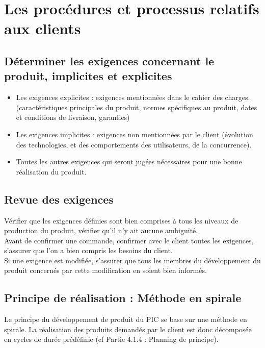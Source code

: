 
\section{Les procédures et processus relatifs aux clients}
\label{client}

\subsection{Déterminer les exigences concernant le produit, implicites et explicites}

\begin{itemize}
\item Les exigences explicites : exigences mentionnées dans le cahier des charges. (caractéristiques principales du produit, normes spécifiques au produit, dates et conditions de livraison, garanties)
\item Les exigences implicites : exigences non mentionnées par le client (évolution des technologies, et des comportements des utilisateurs, de la concurrence).
\item Toutes les autres exigences qui seront jugées nécessaires pour une bonne réalisation du produit.
\end{itemize}

\subsection{Revue des exigences}

Vérifier que les exigences définies sont bien comprises à tous les niveaux de production du produit, vérifier qu’il n’y ait aucune ambiguïté. \\
Avant de confirmer une commande, confirmer avec le client toutes les exigences, s’assurer que l’on a bien compris les besoins du client.\\
Si une exigence est modifiée, s’assurer que tous les membres du développement du produit concernés par cette modification en soient bien informés.\\

\subsection{Principe de réalisation : Méthode en spirale}
Le principe du développement de produit du PIC \nomPIC{} se base sur une méthode en spirale. La réalisation des produits demandés par le client est donc décomposée en cycles de durée prédéfinie (cf Partie 4.1.4 : Planning de principe).


